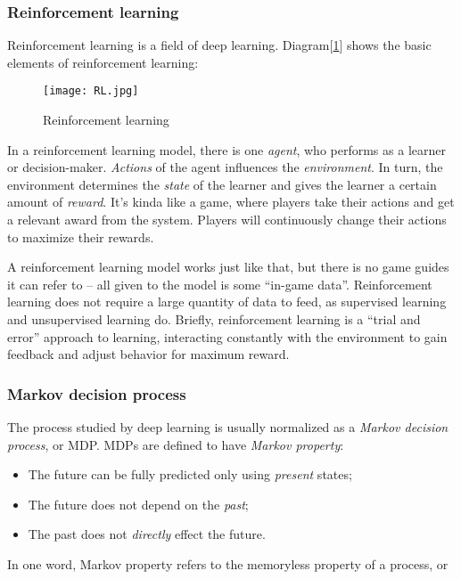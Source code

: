 \documentclass{mcmthesis}
\begin{document}
\subsubsection{Reinforcement learning}

 Reinforcement learning is a field of deep learning.
Diagram[\ref{LA}] shows the basic elements of reinforcement learning:

\begin{figure}[h]
  \small
  \centering
  \texttt{[image: RL.jpg]}
  \caption{Reinforcement learning} \label{LA}
\end{figure}

In a reinforcement learning model, there is one \textit{agent},
who performs as a learner or decision-maker.
\textit{Actions} of the agent influences the \textit{environment}.
In turn, the environment determines the \textit{state} of the learner
and gives the learner a certain amount of \textit{reward}.
It's kinda like a game, where players take their actions and get a relevant award from the system.
Players will continuously change their actions to maximize their rewards.

A reinforcement learning model works just like that,
but there is no game guides it can refer to --
all given to the model is some ``in-game data''.
Reinforcement learning does not require a large quantity of data to feed,
as supervised learning and unsupervised learning do.
Briefly, reinforcement learning is a ``trial and error'' approach to learning,
interacting constantly with the environment to gain feedback and
adjust behavior for maximum reward.

\subsubsection{Markov decision process}

 The process studied by deep learning is usually normalized as a \textit{Markov decision process}, or MDP.
MDPs are defined to have \textit{Markov property}:

\begin{itemize}
  \item The future can be fully predicted only using \textit{present} states;
  \item The future does not depend on the \textit{past};
  \item The past does not \textit{directly} effect the future.
\end{itemize}

In one word, Markov property refers to the memoryless property of a process, or
\end{document}
